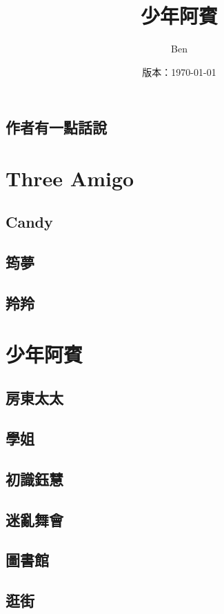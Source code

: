 \documentclass[hyperref]{ctexbook}
\begin{document}
\title{{\bfseries 少年阿賓}}
\author{Ben}
\date{版本：\today}
\maketitle
\chapter*{作者有一點話說}

\part{Three Amigo}
\chapter{Candy}
\chapter{筠夢}
\chapter{羚羚}
\part{少年阿賓}
\chapter{房東太太}
\chapter{學姐}
\chapter{初識鈺慧}
\chapter{迷亂舞會}
\chapter{圖書館}
\chapter{逛街}
\end{document}
